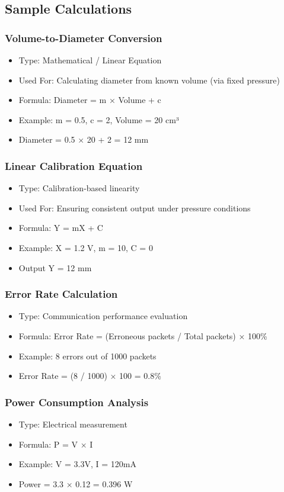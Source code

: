 \documentclass[12pt]{report}
\begin{document}
\subsection{Sample Calculations}
\subsubsection{Volume-to-Diameter Conversion}
\begin{itemize}
    \item Type: Mathematical / Linear Equation
    \item Used For: Calculating diameter from known volume (via fixed pressure)
    \item Formula: Diameter = m × Volume + c
    \item Example: m = 0.5, c = 2, Volume = 20 cm³
    \item Diameter = 0.5 × 20 + 2 = 12 mm
\end{itemize}

\subsubsection{Linear Calibration Equation}
\begin{itemize}
    \item Type: Calibration-based linearity
    \item Used For: Ensuring consistent output under pressure conditions
    \item Formula: Y = mX + C
    \item Example: X = 1.2 V, m = 10, C = 0
    \item Output Y = 12 mm
\end{itemize}

\subsubsection{Error Rate Calculation}
\begin{itemize}
    \item Type: Communication performance evaluation
    \item Formula: Error Rate = (Erroneous packets / Total packets) × 100\%
    \item Example: 8 errors out of 1000 packets
    \item Error Rate = (8 / 1000) × 100 = 0.8\%
\end{itemize}

\subsubsection{Power Consumption Analysis}
\begin{itemize}
    \item Type: Electrical measurement
    \item Formula: P = V × I
    \item Example: V = 3.3V, I = 120mA
    \item Power = 3.3 × 0.12 = 0.396 W
\end{itemize}
\end{document}
